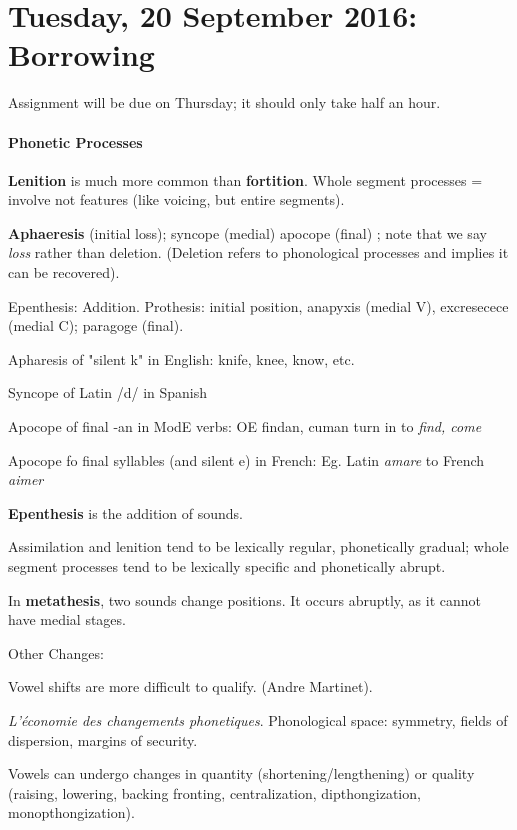 \documentclass{exam}
\begin{document}
\section*{Tuesday, 20 September 2016: Borrowing}

\noindent Assignment will be due on Thursday; it should only take half an hour. \\

\paragraph{Phonetic Processes} \textbf{Lenition} is much more common than \textbf{fortition}. Whole segment processes = involve not features (like voicing, but entire segments). 

\textbf{Aphaeresis} (initial loss); syncope (medial) apocope (final) ; note that we say \textit{loss} rather than deletion. (Deletion refers to phonological processes and implies it can be recovered).

Epenthesis: Addition. Prothesis: initial position, anapyxis (medial V), excresecece (medial C); paragoge (final).

\begin{center}
Apharesis of "silent k" in English: knife, knee, know, etc.

Syncope of Latin /d/ in Spanish

Apocope of final -an in ModE verbs: OE findan, cuman turn in to \textit{find, come}

Apocope fo final syllables (and silent e) in French: Eg. Latin \textit{amare} to French \textit{aimer}

\end{center}
\textbf{Epenthesis} is the addition of sounds.

Assimilation and lenition tend to be lexically regular, phonetically gradual; whole segment processes tend to be lexically specific and phonetically abrupt. 

In \textbf{metathesis}, two sounds change positions. 
It occurs abruptly, as it cannot have medial stages. 

Other Changes:

Vowel shifts are more difficult to qualify. (Andre Martinet). 

\textit{L'économie des changements phonetiques}. 
Phonological space: symmetry, fields of dispersion, margins of security. 


Vowels can undergo changes in quantity (shortening/lengthening) or quality (raising, lowering, backing fronting, centralization, dipthongization, monopthongization).
\end{document}
